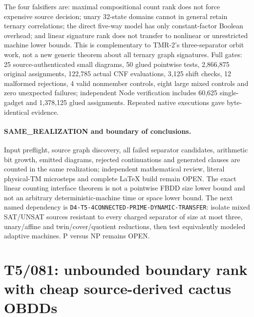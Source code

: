 \documentclass[11pt]{article}
\begin{document}
The four falsifiers are: maximal compositional count rank does not
force expensive source decision; unary 32-state domains cannot in
general retain ternary correlations; the direct five-way model has
only constant-factor Boolean overhead; and linear signature rank
does not transfer to nonlinear or unrestricted machine lower bounds.
This is complementary to TMR-2's three-separator orbit work,
not a new generic theorem about all ternary graph signatures.
Full gates: 25 source-authenticated small diagrams, 50 glued
pointwise tests, 2,866,875 original assignments, 122,785 actual
CNF evaluations, 3,125 shift checks, 12 malformed rejections,
4 valid nonmember controls, eight large mixed controls and zero
unexpected failures; independent Node verification includes
60,625 single-gadget and 1,378,125 glued assignments.
Repeated native executions gave byte-identical evidence.

\paragraph{SAME\_REALIZATION and boundary of conclusions.}
Input preflight, source graph discovery, all failed separator
candidates, arithmetic bit growth, emitted diagrams, rejected
continuations and generated clauses are counted in the same
realization; independent mathematical review, literal physical-TM
microsteps and complete \LaTeX{} build remain OPEN. The exact
linear counting interface theorem is not a pointwise FBDD size
lower bound and not an arbitrary deterministic-machine time or
space lower bound. The next named dependency is
\texttt{D4-T5-4CONNECTED-PRIME-DYNAMIC-TRANSFER}: isolate mixed
SAT/UNSAT sources resistant to every charged separator of size
at most three, unary/affine and twin/cover/quotient reductions,
then test equivalently modeled adaptive machines. P versus NP
remains OPEN.




\section{T5/081: unbounded boundary rank with cheap source-derived cactus OBDDs}
\label{sec:t5cactus081}
\end{document}
